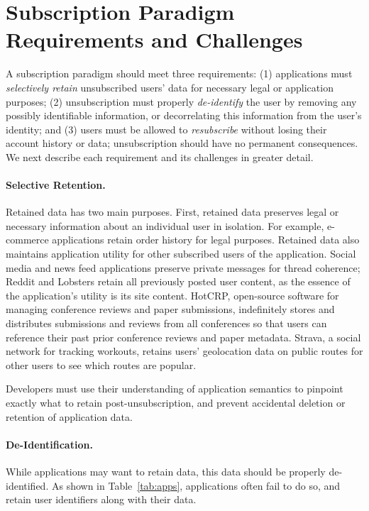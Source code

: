\section{Subscription Paradigm Requirements and Challenges}

A subscription paradigm should meet three requirements: (1) applications must \emph{selectively
retain} unsubscribed users' data for necessary legal or application
purposes; (2) unsubscription must properly \emph{de-identify} the user by
removing any possibly identifiable information, or decorrelating this information from the user's
identity; and (3) users must be allowed to \emph{resubscribe} without losing their account history
or data; unsubscription should have no permanent consequences. We next describe each requirement and its
challenges in greater detail.

\paragraph{Selective Retention.}
Retained data has two main purposes. First, retained data preserves legal or
necessary information about an individual user in isolation. For example, e-commerce applications
retain order history for legal purposes.
Retained data also maintains application utility for other subscribed users of the application.
Social media and news feed applications preserve private messages for thread coherence; Reddit and
Lobsters retain all previously posted user content, as the essence of the application's utility is
its site content.  HotCRP, open-source software for managing conference reviews and paper
submissions, indefinitely stores and distributes submissions and reviews from all conferences so
that users can reference their past prior conference reviews and paper metadata. Strava, a social
network for tracking workouts, retains users' geolocation data on public routes for other users to
see which routes are popular.

Developers must use their understanding of application semantics to pinpoint exactly what 
to retain post-unsubscription, and prevent accidental deletion or retention of application
data.

\paragraph{De-Identification.}
While applications may want to retain data, this data should be properly de-identified. As shown in
Table~\ref{tab:apps}, applications often fail to do so, and retain user identifiers along with their
data. 

